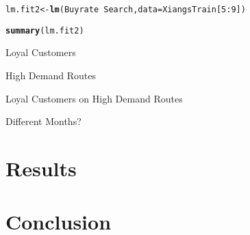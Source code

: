 \documentclass{article}\usepackage[]{graphicx}\usepackage[]{color}
\makeatletter
\newcommand{\hlnum}[1]{\textcolor[rgb]{0.686,0.059,0.569}{#1}}%
\newcommand{\hlopt}[1]{\textcolor[rgb]{0,0,0}{#1}}%
\newcommand{\hlstd}[1]{\textcolor[rgb]{0.345,0.345,0.345}{#1}}%
\newcommand{\hlkwb}[1]{\textcolor[rgb]{0.69,0.353,0.396}{#1}}%
\newcommand{\hlkwc}[1]{\textcolor[rgb]{0.333,0.667,0.333}{#1}}%
\newcommand{\hlkwd}[1]{\textcolor[rgb]{0.737,0.353,0.396}{\textbf{#1}}}%
\newenvironment{kframe}{%
 \def\at@end@of@kframe{}%
 \ifinner\ifhmode%
  \def\at@end@of@kframe{\end{minipage}}%
  \begin{minipage}{\columnwidth}%
 \fi\fi%
 \def\FrameCommand##1{\hskip\@totalleftmargin \hskip-\fboxsep
 \colorbox{shadecolor}{##1}\hskip-\fboxsep
     \hskip-\linewidth \hskip-\@totalleftmargin \hskip\columnwidth}%
 \MakeFramed {\advance\hsize-\width
   \@totalleftmargin\z@ \linewidth\hsize
   \@setminipage}}%
 {\par\unskip\endMakeFramed%
 \at@end@of@kframe}
\newenvironment{knitrout}{}{} %
\makeatother
\begin{document}
\begin{knitrout}
\begin{kframe}
{\ttfamily\noindent\bfseries\color{errorcolor}{\#\# Error in summary(lm.fit1): object 'lm.fit1' not found}}\begin{alltt}
\hlstd{lm.fit2}\hlkwb{<-}\hlkwd{lm}\hlstd{(Buyrate}\hlopt{~}\hlstd{Search,} \hlkwc{data}\hlstd{=XiangsTrain[}\hlnum{5}\hlopt{:}\hlnum{9}\hlstd{])}
\end{alltt}


{\ttfamily\noindent\bfseries\color{errorcolor}{\#\# Error in is.data.frame(data): object 'XiangsTrain' not found}}\begin{alltt}
\hlkwd{summary}\hlstd{(lm.fit2)}
\end{alltt}


{\ttfamily\noindent\bfseries\color{errorcolor}{\#\# Error in summary(lm.fit2): object 'lm.fit2' not found}}\end{kframe}
\end{knitrout}

Loyal Customers

High Demand Routes

Loyal Customers on High Demand Routes

Different Months?

\section{Results}

\section{Conclusion}
\end{document}
